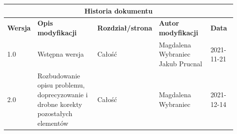\documentclass{sprz}
\begin{document}
\begin{documenttable}[]
\end{documenttable}
\begin{center}
  \begin{tabular}{ |p{0.1\linewidth}|p{0.28\linewidth}|p{0.2\linewidth}|p{0.24\linewidth}|p{0.12\linewidth}| }
    \hline
    \multicolumn{5}{|c|}{\textbf{Historia dokumentu}} \\
    \hline
    \textbf{Wersja} & \textbf{Opis modyfikacji} & \textbf{Rozdział/strona} & \textbf{Autor modyfikacji} & \textbf{Data}\\
    \hline
    {1.0} & {Wstępna wersja} & {Całość} & {Magdalena Wybraniec \newline Jakub Prucnal} & {2021-11-21}\\
    \hline
    {2.0} & {Rozbudowanie opisu problemu, doprecyzowanie i drobne korekty pozostałych elementów} &
    {Całość} & {Magdalena Wybraniec} & {2021-12-14}\\
    \hline
  \end{tabular}
\end{center}
\end{document}

